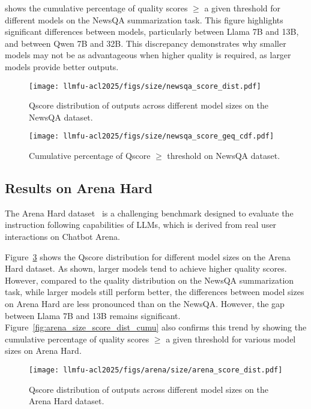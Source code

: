  shows the cumulative percentage of quality scores $\geq$ a given threshold for different models on the NewsQA summarization task. This figure highlights significant differences between models, particularly between Llama 7B and 13B, and between Qwen 7B and 32B. This discrepancy demonstrates why smaller models may not be as advantageous when higher quality is required, as larger models provide better outputs.

\begin{figure}[!t]
    \centering
    \texttt{[image: llmfu-acl2025/figs/size/newsqa\_score\_dist.pdf]}
    \vspace{-0.3in}
    \caption{Qscore distribution of outputs across different model sizes on the NewsQA dataset.}
    \label{fig:size_newsqa_score_dist}
\end{figure}


\begin{figure}[!t]
    \centering
    \texttt{[image: llmfu-acl2025/figs/size/newsqa\_score\_geq\_cdf.pdf]}
    \caption{Cumulative percentage of Qscore $\geq$ threshold on NewsQA dataset.}
    \label{fig:size_newsqa_score_cdf}
\end{figure}

\subsection{Results on Arena Hard}
The Arena Hard dataset~\cite{li2024arenahard} is a challenging benchmark designed to evaluate the instruction following capabilities of LLMs, which is derived from real user interactions on Chatbot Arena.

Figure~\ref{fig:arena_size_score_dist} shows the Qscore distribution for different model sizes on the Arena Hard dataset. As shown, larger models tend to achieve higher quality scores. However, compared to the quality distribution on the NewsQA summarization task, while larger models still perform better, the differences between model sizes on Arena Hard are less pronounced than on the NewsQA. However, the gap between Llama 7B and 13B remains significant. Figure~\ref{fig:arena_size_score_dist_cumu} also confirms this trend by showing the cumulative percentage of quality scores $\geq$ a given threshold for various model sizes on Arena Hard. 

\begin{figure}[!t]
    \centering
    \texttt{[image: llmfu-acl2025/figs/arena/size/arena\_score\_dist.pdf]}
    \caption{Qscore distribution of outputs across different model sizes on the Arena Hard dataset.}
    \label{fig:arena_size_score_dist}
\end{figure}

